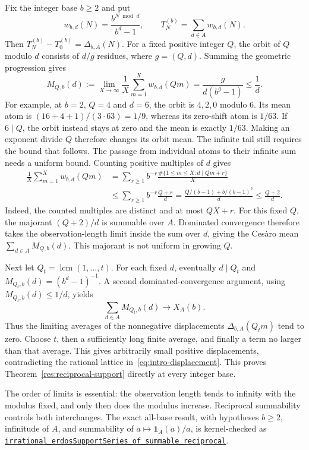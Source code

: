 \documentclass[11pt]{article}
\begin{document}
Fix the integer base $b\ge2$ and put
\[
 w_{b,d}(N)=\frac{b^{N\bmod d}}{b^d-1},\qquad
 T_N^{(b)}=\sum_{d\in A}w_{b,d}(N).
\]
Then $T_N^{(b)}-T_0^{(b)}=\Delta_{b,A}(N)$.
For a fixed positive integer $Q$, the orbit of $Q$ modulo $d$ consists of
$d/g$ residues, where $g=(Q,d)$.  Summing the geometric progression gives
\begin{equation}
 M_{Q,b}(d):=\lim_{X\to\infty}\frac1X\sum_{m=1}^Xw_{b,d}(Qm)
 =\frac{g}{d(b^g-1)}\le\frac1d.
 \label{eq:gcd-orbit-mean}
\end{equation}
For example, at $b=2$, $Q=4$ and $d=6$, the orbit is $4,2,0$ modulo $6$.
Its mean atom is $(16+4+1)/(3\cdot63)=1/9$, whereas its zero-shift atom is
$1/63$. If $6\mid Q$, the orbit instead stays at zero and the mean is
exactly $1/63$. Making an exponent divide $Q$ therefore changes its orbit mean.  The
infinite tail still requires the bound that follows.
The passage from individual atoms to their infinite sum needs a uniform
bound.  Counting positive multiples of $d$ gives
\begin{align*}
 \frac1X\sum_{m=1}^Xw_{b,d}(Qm)
 &=\sum_{r\ge1}b^{-r}
       \frac{\#\{1\le m\le X:d\mid Qm+r\}}X\\
 &\le\sum_{r\ge1}b^{-r}\frac{Q+r}{d}
 =\frac{Q/(b-1)+b/(b-1)^2}{d}\le\frac{Q+2}{d}.
\end{align*}
Indeed, the counted multiples are distinct and at most $QX+r$.
For this fixed $Q$, the majorant $(Q+2)/d$ is summable over $A$.
Dominated convergence therefore takes the observation-length limit inside
the sum over $d$, giving the Ces\`aro mean
$\sum_{d\in A}M_{Q,b}(d)$.  This majorant is not uniform in growing $Q$.

Next let $Q_t=\operatorname{lcm}(1,\ldots,t)$.
For each fixed $d$, eventually $d\mid Q_t$ and
$M_{Q_t,b}(d)=(b^d-1)^{-1}$.  A second dominated-convergence argument,
using $M_{Q_t,b}(d)\le1/d$, yields
\begin{equation}
 \sum_{d\in A}M_{Q_t,b}(d)\longrightarrow X_A(b).
 \label{eq:lcm-prefix-orbit-limit}
\end{equation}
Thus the limiting averages of the nonnegative displacements
$\Delta_{b,A}(Q_tm)$ tend to zero.  Choose $t$, then a sufficiently long
finite average, and finally a term no larger than that average.
This gives arbitrarily small positive displacements, contradicting the
rational lattice in~\eqref{eq:intro-displacement}.  This proves
Theorem~\ref{res:reciprocal-support} directly at every integer base.

The order of limits is essential: the observation length tends to infinity
with the modulus fixed, and only then does the modulus increase.
Reciprocal summability controls both interchanges.  The exact all-base result,
with hypotheses $b\ge2$, infinitude of $A$, and summability of $a\mapsto
\mathbf1_A(a)/a$, is kernel-checked as
\href{https://github.com/wcook04/plectis-erdos/blob/065e09523286894dfb57ba205e69666843817009/lean/Erdos249257/AllBaseReciprocalSupportIrrationality.lean#L395}{\texttt{irrational\_erdosSupportSeries\_of\_summable\_reciprocal}}.
\end{document}
